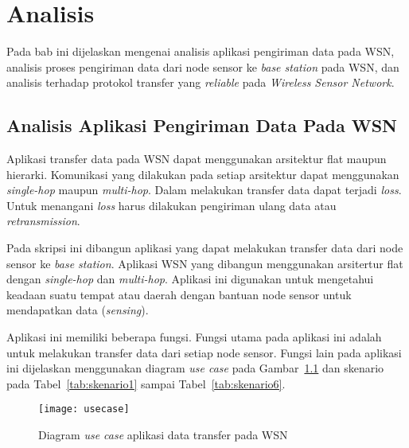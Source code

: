 \chapter{Analisis}
\label{chap:analisis}
Pada bab ini dijelaskan mengenai analisis aplikasi pengiriman data pada WSN, analisis proses pengiriman data dari node sensor ke \textit{base station} pada WSN, dan analisis terhadap protokol transfer yang \textit{reliable} pada \textit{Wireless Sensor Network}.

\section{Analisis Aplikasi Pengiriman Data Pada WSN}
Aplikasi transfer data pada WSN dapat menggunakan arsitektur flat maupun hierarki. Komunikasi yang dilakukan pada setiap arsitektur dapat menggunakan \textit{single-hop} maupun \textit{multi-hop}. Dalam melakukan transfer data dapat terjadi \textit{loss}. Untuk menangani \textit{loss} harus dilakukan pengiriman ulang data atau \textit{retransmission}.

Pada skripsi ini dibangun aplikasi yang dapat melakukan transfer data dari node sensor ke \textit{base station}. Aplikasi WSN yang dibangun menggunakan arsitertur flat dengan \textit{single-hop} dan \textit{multi-hop}. Aplikasi ini digunakan untuk mengetahui keadaan suatu tempat atau daerah dengan bantuan node sensor untuk mendapatkan data (\textit{sensing}). 

Aplikasi ini memiliki beberapa fungsi. Fungsi utama pada aplikasi ini adalah untuk melakukan transfer data dari setiap node sensor. Fungsi lain pada aplikasi ini dijelaskan menggunakan diagram \textit{use case} pada Gambar~\ref{fig:usecase} dan skenario pada Tabel~\ref{tab:skenario1} sampai Tabel~\ref{tab:skenario6}.

\begin{figure}[H]
	\centering
	\texttt{[image: usecase]}
	\caption{Diagram \textit{use case} aplikasi data transfer pada WSN}
	\label{fig:usecase}
\end{figure}

